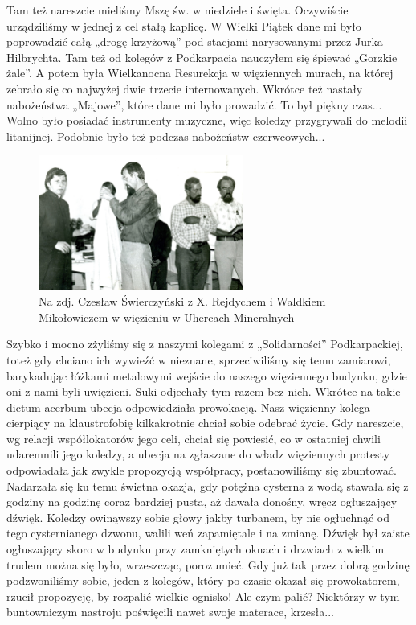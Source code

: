 Tam też nareszcie mieliśmy Mszę św. w niedziele i święta. Oczywiście urządziliśmy w jednej z cel stałą kaplicę. W Wielki Piątek dane mi było poprowadzić całą „drogę krzyżową” pod stacjami narysowanymi przez Jurka Hilbrychta. Tam też od kolegów z Podkarpacia nauczyłem się śpiewać „Gorzkie żale”. A potem była Wielkanocna Resurekcja w więziennych murach, na której zebrało się co najwyżej dwie trzecie internowanych. Wkrótce też nastały nabożeństwa „Majowe”, które dane mi było prowadzić. To był piękny czas... Wolno było posiadać instrumenty muzyczne, więc koledzy przygrywali do melodii litanijnej. Podobnie było też podczas nabożeństw czerwcowych...
\begin{figure}[!h]
\begin{center}
\includegraphics[width=0.6\textwidth]{photo/czeslaw_swierczynski_wiezienie_1.jpg}
\caption[Czesław Świerczyński w Uhercach Mineralnych]{Na zdj. Czesław Świerczyński z X. Rejdychem i Waldkiem Mikołowiczem w więzieniu w Uhercach Mineralnych}
\end{center}
\end{figure}

Szybko i mocno zżyliśmy się z naszymi kolegami z „Solidarności” Podkarpackiej, toteż gdy chciano ich wywieźć w nieznane, sprzeciwiliśmy się temu zamiarowi, barykadując łóżkami metalowymi wejście do naszego więziennego budynku, gdzie oni z nami byli uwięzieni. Suki odjechały tym razem bez nich. Wkrótce na takie dictum acerbum ubecja odpowiedziała prowokacją. Nasz więzienny kolega cierpiący na klaustrofobię kilkakrotnie chciał sobie odebrać życie. Gdy nareszcie, wg relacji współlokatorów jego celi, chciał się powiesić, co w ostatniej chwili udaremnili jego koledzy, a ubecja na zgłaszane do władz więziennych protesty odpowiadała jak zwykle propozycją współpracy, postanowiliśmy się zbuntować. Nadarzała się ku temu świetna okazja, gdy potężna cysterna z wodą stawała się z godziny na godzinę coraz bardziej pusta, aż dawała donośny, wręcz ogłuszający dźwięk. Koledzy owinąwszy sobie głowy jakby turbanem, by nie ogłuchnąć od tego cysternianego dzwonu, walili weń zapamiętale i na zmianę. Dźwięk był zaiste ogłuszający skoro w budynku przy zamkniętych oknach i drzwiach z wielkim trudem można się było, wrzeszcząc, porozumieć. Gdy już tak przez dobrą godzinę podzwoniliśmy sobie, jeden z kolegów, który po czasie okazał się prowokatorem, rzucił propozycję, by rozpalić wielkie ognisko! Ale czym palić? Niektórzy w tym buntowniczym nastroju poświęcili nawet swoje materace, krzesła...

